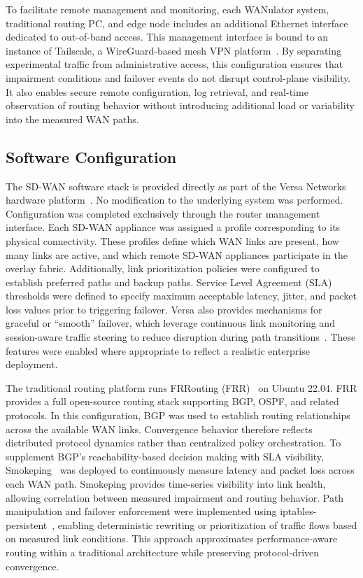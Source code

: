 \documentclass[conference]{IEEEtran}
\begin{document}
To facilitate remote management and monitoring, each WANulator system, traditional routing PC, and edge node includes an additional Ethernet interface dedicated to out-of-band access. This management interface is bound to an instance of Tailscale, a WireGuard-based mesh VPN platform~\cite{tailscale_home}. By separating experimental traffic from administrative access, this configuration ensures that impairment conditions and failover events do not disrupt control-plane visibility. It also enables secure remote configuration, log retrieval, and real-time observation of routing behavior without introducing additional load or variability into the measured WAN paths.

\subsection{Software Configuration}

The SD-WAN software stack is provided directly as part of the Versa Networks hardware platform~\cite{versa_csg700_series}. No modification to the underlying system was performed. Configuration was completed exclusively through the router management interface. Each SD-WAN appliance was assigned a profile corresponding to its physical connectivity. These profiles define which WAN links are present, how many links are active, and which remote SD-WAN appliances participate in the overlay fabric. Additionally, link prioritization policies were configured to establish preferred paths and backup paths. Service Level Agreement (SLA) thresholds were defined to specify maximum acceptable latency, jitter, and packet loss values prior to triggering failover. Versa also provides mechanisms for graceful or “smooth” failover, which leverage continuous link monitoring and session-aware traffic steering to reduce disruption during path transitions~\cite{versa_sla_monitoring}. These features were enabled where appropriate to reflect a realistic enterprise deployment.

The traditional routing platform runs FRRouting (FRR)~\cite{frr2023} on Ubuntu 22.04. FRR provides a full open-source routing stack supporting BGP, OSPF, and related protocols. In this configuration, BGP was used to establish routing relationships across the available WAN links. Convergence behavior therefore reflects distributed protocol dynamics rather than centralized policy orchestration. To supplement BGP’s reachability-based decision making with SLA visibility, Smokeping~\cite{smokeping_home} was deployed to continuously measure latency and packet loss across each WAN path. Smokeping provides time-series visibility into link health, allowing correlation between measured impairment and routing behavior. Path manipulation and failover enforcement were implemented using iptables-persistent~\cite{iptables_persistent}, enabling deterministic rewriting or prioritization of traffic flows based on measured link conditions. This approach approximates performance-aware routing within a traditional architecture while preserving protocol-driven convergence.
\end{document}

